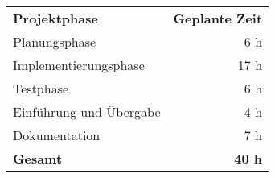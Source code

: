 \begin{tabular}{lr}
\rowcolor{heading}\textbf{Projektphase} & \textbf{Geplante Zeit} \\
Planungsphase & 6 h \\
\rowcolor{odd}Implementierungsphase & 17 h \\
Testphase & 6 h \\
\rowcolor{odd}Einführung und Übergabe & 4 h \\
Dokumentation & 7 h\\
\hline
\hline
\rowcolor{odd}\textbf{Gesamt} & \textbf{40 h} \\
\end{tabular}